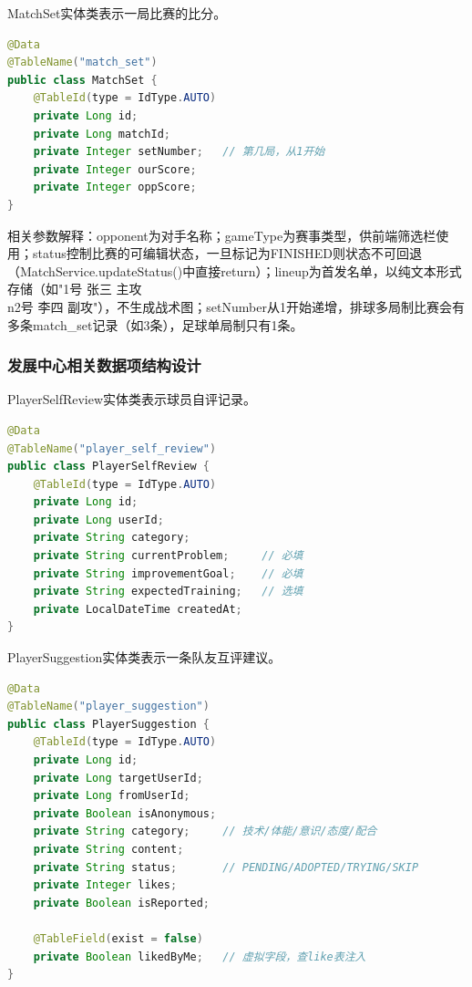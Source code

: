 \documentclass[12pt,a4paper]{ctexart}
\begin{document}
MatchSet实体类表示一局比赛的比分。

\begin{lstlisting}[language=Java, caption=MatchSet.java]
@Data
@TableName("match_set")
public class MatchSet {
    @TableId(type = IdType.AUTO)
    private Long id;
    private Long matchId;
    private Integer setNumber;   // 第几局，从1开始
    private Integer ourScore;
    private Integer oppScore;
}
\end{lstlisting}

相关参数解释：opponent为对手名称；gameType为赛事类型，供前端筛选栏使用；status控制比赛的可编辑状态，一旦标记为FINISHED则状态不可回退（MatchService.updateStatus()中直接return）；lineup为首发名单，以纯文本形式存储（如"1号 张三 主攻\\n2号 李四 副攻"），不生成战术图；setNumber从1开始递增，排球多局制比赛会有多条match\_set记录（如3条），足球单局制只有1条。

\subsubsection{发展中心相关数据项结构设计}

PlayerSelfReview实体类表示球员自评记录。

\begin{lstlisting}[language=Java, caption=PlayerSelfReview.java]
@Data
@TableName("player_self_review")
public class PlayerSelfReview {
    @TableId(type = IdType.AUTO)
    private Long id;
    private Long userId;
    private String category;
    private String currentProblem;     // 必填
    private String improvementGoal;    // 必填
    private String expectedTraining;   // 选填
    private LocalDateTime createdAt;
}
\end{lstlisting}

PlayerSuggestion实体类表示一条队友互评建议。

\begin{lstlisting}[language=Java, caption=PlayerSuggestion.java]
@Data
@TableName("player_suggestion")
public class PlayerSuggestion {
    @TableId(type = IdType.AUTO)
    private Long id;
    private Long targetUserId;
    private Long fromUserId;
    private Boolean isAnonymous;
    private String category;     // 技术/体能/意识/态度/配合
    private String content;
    private String status;       // PENDING/ADOPTED/TRYING/SKIP
    private Integer likes;
    private Boolean isReported;

    @TableField(exist = false)
    private Boolean likedByMe;   // 虚拟字段，查like表注入
}
\end{lstlisting}
\end{document}
